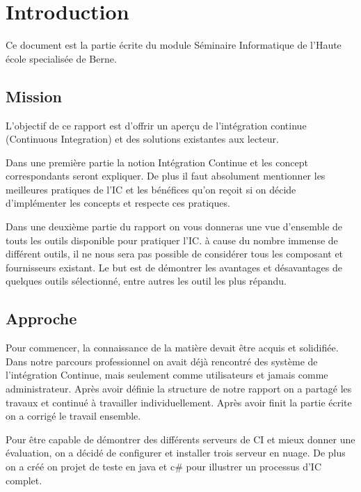 \chapter{Introduction}
\label{chap:introduction}
Ce document est la partie écrite du module Séminaire Informatique de l'Haute école specialisée de Berne.

\section{Mission}
\label{sec:intro_mission}
L'objectif de ce rapport est d'offrir un aperçu de l'intégration continue (Continuous Integration) et des solutions existantes aux lecteur.

Dans une première partie la notion Intégration Continue et les concept correspondants seront expliquer. De plus il faut absolument mentionner les meilleures pratiques de l'IC et les bénéfices qu'on reçoit si on décide d'implémenter les concepts et respecte ces pratiques.

Dans une deuxième partie du rapport on vous donneras une vue d'ensemble de touts les outils disponible pour pratiquer l'IC. à cause du nombre immense de différent outils, il ne nous sera pas possible de considérer tous les composant et fournisseurs existant. Le but est de démontrer les avantages et désavantages de quelques outils sélectionné, entre autres les outil les plus répandu.

\section{Approche}
\label{sec:intro_approche}

Pour commencer, la connaissance de la matière devait être acquis et solidifiée. Dans notre parcours professionnel on avait déjà rencontré des système de l'intégration Continue, mais seulement comme utilisateurs et jamais comme administrateur. Après avoir définie la structure de notre rapport on a partagé les travaux et continué à travailler individuellement. Après avoir finit la partie écrite on a corrigé le travail ensemble.

Pour être capable de démontrer des différents serveurs de CI et mieux donner une évaluation, on a décidé de configurer et installer trois serveur en nuage. De plus on a créé on projet de teste en java et c\# pour illustrer un processus d'IC complet.
